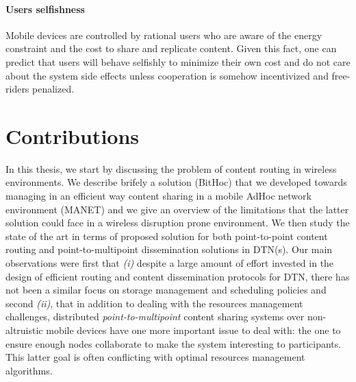 \paragraph{Users selfishness}

Mobile devices are controlled by rational users who are aware of the energy constraint and the cost to share and replicate content. Given this fact, one can predict that users will behave selfishly to minimize their own cost and do not care about the system side effects unless cooperation is somehow incentivized and free-riders penalized. 

\section{Contributions}

In this thesis, we start by discussing the problem of content routing in wireless environments. We describe brifely a solution (BitHoc) that we developed towards managing in an efficient way content sharing in a mobile AdHoc network environment (MANET) and we give an overview of the limitations that the latter solution could face in a wireless disruption prone environment. We then study the state of the art in terms of proposed solution for both point-to-point content routing and point-to-multipoint dissemination solutions in DTN(s). Our main observations were first that \emph{(i)} despite a large amount of effort invested in the design of efficient routing and content dissemination protocols for DTN, there has not been a similar focus on storage management and scheduling policies and second \emph{(ii)}, that in addition to dealing with the resources management challenges, distributed \emph{point-to-multipoint} content sharing systems over non-altruistic mobile devices have one more important issue to deal with: the one to ensure enough nodes collaborate to make the system interesting to participants. This latter goal is often conflicting with optimal resources management algorithms. 

